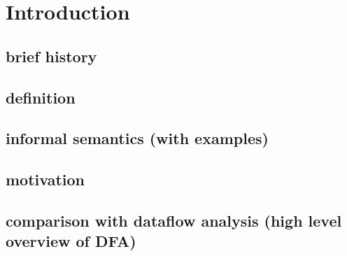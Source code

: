 \chapter{Introduction}



\section{brief history}
\section{definition}
\section{informal semantics (with examples)}
\section{motivation}
\section{comparison with dataflow analysis (high level overview of DFA)}

